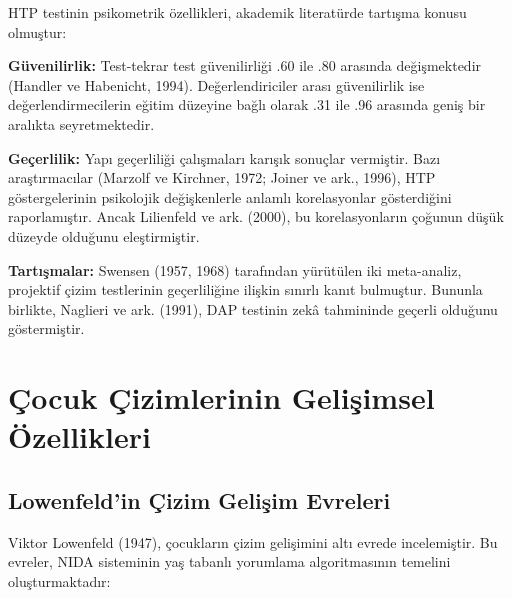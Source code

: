 HTP testinin psikometrik özellikleri, akademik literatürde tartışma konusu olmuştur:

\textbf{Güvenilirlik:} Test-tekrar test güvenilirliği .60 ile .80 arasında değişmektedir (Handler ve Habenicht, 1994). Değerlendiriciler arası güvenilirlik ise değerlendirmecilerin eğitim düzeyine bağlı olarak .31 ile .96 arasında geniş bir aralıkta seyretmektedir.

\textbf{Geçerlilik:} Yapı geçerliliği çalışmaları karışık sonuçlar vermiştir. Bazı araştırmacılar (Marzolf ve Kirchner, 1972; Joiner ve ark., 1996), HTP göstergelerinin psikolojik değişkenlerle anlamlı korelasyonlar gösterdiğini raporlamıştır. Ancak Lilienfeld ve ark. (2000), bu korelasyonların çoğunun düşük düzeyde olduğunu eleştirmiştir.

\textbf{Tartışmalar:} Swensen (1957, 1968) tarafından yürütülen iki meta-analiz, projektif çizim testlerinin geçerliliğine ilişkin sınırlı kanıt bulmuştur. Bununla birlikte, Naglieri ve ark. (1991), DAP testinin zekâ tahmininde geçerli olduğunu göstermiştir.

\section{Çocuk Çizimlerinin Gelişimsel Özellikleri}

\subsection{Lowenfeld'in Çizim Gelişim Evreleri}

Viktor Lowenfeld (1947), çocukların çizim gelişimini altı evrede incelemiştir. Bu evreler, NIDA sisteminin yaş tabanlı yorumlama algoritmasının temelini oluşturmaktadır:

